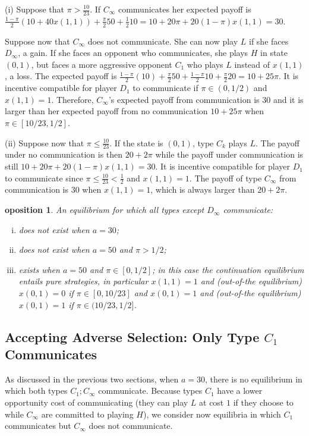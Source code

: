 \documentclass[12pt]{article}
\newtheorem{proposition}{\text{Pr}oposition}
\theoremstyle{definition}
\theoremstyle{remark}
\begin{document}
(i) Suppose that $\pi> \frac{10}{23}$. 
If $C_\infty$ communicates her expected payoff is $\frac{1-\pi}{2}(10+40x(1,1))+\frac{\pi}{2}50+\frac{1}{2}10=10+20\pi+20(1-\pi)x(1,1)=30$.

Suppose now that $C_\infty$ does not communicate. She can now play $L$ if she faces $D_\infty$, a gain. If she faces an opponent who communicates, she plays $H$ in state $(0,1)$, but faces a more aggressive opponent $C_1$ who plays $L$ instead of $x(1,1)$, a loss. The expected payoff is $\frac{1-\pi}{2}(10)+\frac{\pi}{2}50+\frac{1-\pi}{2}10+\frac{\pi}{2}20=10+25\pi$. It is incentive compatible for player $D_1$ to communicate if $\pi\in(0,1/2)$ and $x(1,1)=1$. Therefore, $C_\infty$'s expected payoff from communication is $30$ and it is larger than her expected payoff from no communication $10+25\pi$ when $\pi\in[10/23,1/2]$.

(ii) Suppose now that $\pi\leq \frac{10}{23}$. If the state is $(0,1)$, type $C_k$ plays $L$. The payoff under no communication is then $20+2\pi$ while the payoff under communication is still $10+20\pi+20(1-\pi)x(1,1)=30$. It is incentive compatible for player $D_1$ to communicate since $\pi\leq \frac{10}{23}<\frac{1}{2}$ and $x(1,1)=1$. The payoff of type $C_\infty$ from communication is $30$ when $x(1,1)=1$, which is always larger than $20+2\pi$.

%
\begin{proposition}\label{prop:CT30-noDinfty}
An equilibrium for which all types except $D_\infty$ communicate:
	\begin{enumerate}[(i)]
		\item does not exist when $a=30$;
		\item does not exist when $a=50$ and $\pi>1/2$;
		\item exists when $a=50$ and $\pi\in[0,1/2]$; in this case the continuation equilibrium entails pure strategies, in particular $x(1,1)=1$ and (out-of-the equilibrium) $x(0,1)=0$ if $\pi\in[0,10/23]$ and $x(0,1)=1$ and (out-of-the equilibrium) $x(0,1)=1$ if $\pi\in(10/23,1/2]$.
	\end{enumerate}
\end{proposition}
%
\subsection{Accepting Adverse Selection: Only Type $C_1$ Communicates}

As discussed in the previous two sections, when $a=30$, there is no equilibrium in which both types $C_1;C_\infty$ communicate. Because types $C_1$ have a lower opportunity cost of communicating (they can play $L$ at cost $1$ if they choose to while $C_\infty$ are committed to playing $H$), we consider now equilibria in which $C_1$ communicates but $C_\infty$ does not communicate.
\end{document}
